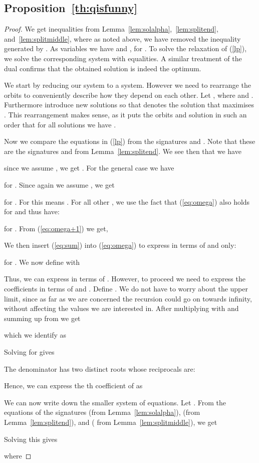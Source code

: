 \documentclass[11pt,a4paper]{article}
\begin{document}
\subsection*{Proposition~\ref{th:qisfunny}}
\begin{proof}
We get  inequalities from Lemma~\ref{lem:solalpha},~\ref{lem:splitend}, 
and~\ref{lem:splitmiddle}, where as noted above, we have removed the inequality
generated by .
As variables we have  and , for .
To solve the relaxation of (\ref{lp}), we solve the corresponding system with
equalities.
A similar treatment of the dual confirms that the obtained solution is
indeed the optimum.



We start by reducing our  system to
a  system.
However we need to rearrange the orbits to conveniently describe how they depend on each other. Let , where  and . Furthermore introduce new solutions  so that  denotes the solution that maximises . This rearrangement makes sense, as it puts the orbits and solution in such an order that for all solutions  we have .

Now we compare the equations in (\ref{lp}) from the signatures  and .  Note that these are the signatures  and  from Lemma~\ref{lem:splitend}. We see then that we have 
 
since we assume , we get .
For the general case we have

for .
Since again we assume , we get

for . For  this means . For all other , we use the fact that (\ref{eq:omega}) also holds for  and thus have:

for .
From (\ref{eq:omega+1}) we get,

We then insert (\ref{eq:sum}) into (\ref{eq:omega}) to express  in terms of  and  only:

for .
We now define  with

Thus, we can express  in terms of . However, to proceed we need to express the coefficients  in terms of  and . Define . We do not have to worry about the upper limit, since as far as we are concerned the recursion could go on towards infinity, without affecting the values we are interested in. After multiplying with  and summing up from  we get

which we identify as

Solving for  gives

The denominator has two distinct roots whose reciprocals are:

Hence, we can express the th coefficient of  as

We can now write down the smaller  system of equations. Let . From the equations of the signatures  (from Lemma~\ref{lem:solalpha}),  (from Lemma~\ref{lem:splitend}), and  ( from Lemma~\ref{lem:splitmiddle}), we get

Solving this gives

where

\end{proof}
\end{document}
